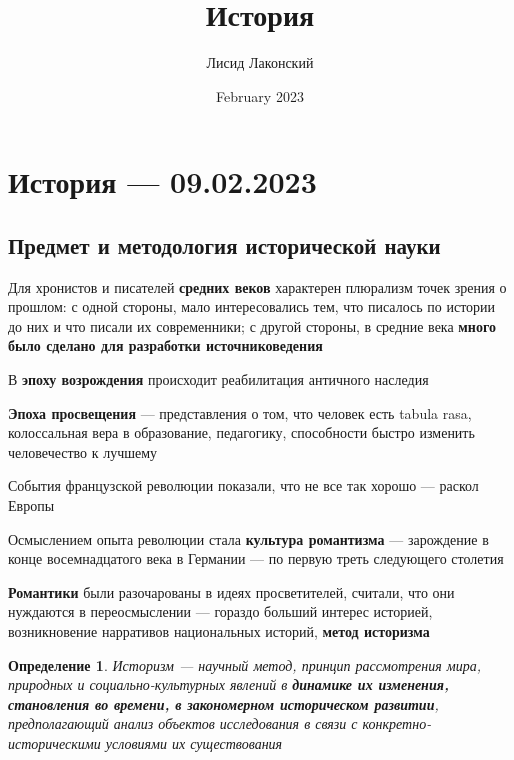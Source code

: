 \documentclass{article}
\title{История}
\author{Лисид Лаконский}
\date{February 2023}
\newtheorem{definition}{Определение}
\begin{document}
\raggedright

\maketitle
\tableofcontents
\pagebreak

\section{История — 09.02.2023}

\subsection{Предмет и методология исторической науки}

Для хронистов и писателей \textbf{средних веков} характерен плюрализм точек зрения о прошлом: с одной стороны, мало интересовались тем, что писалось по истории до них и что писали их современники; с другой стороны, в средние века \textbf{много было сделано для разработки источниковедения}

\hfill

В \textbf{эпоху возрождения} происходит реабилитация античного наследия

\hfill

\textbf{Эпоха просвещения} — представления о том, что человек есть tabula rasa, колоссальная вера в образование, педагогику, способности быстро изменить человечество к лучшему

События французской революции показали, что не все так хорошо — раскол Европы

\hfill

Осмыслением опыта революции стала \textbf{культура романтизма} — зарождение в конце восемнадцатого века в Германии — по первую треть следующего столетия

\textbf{Романтики} были разочарованы в идеях просветителей, считали, что они нуждаются в переосмыслении — гораздо больший интерес историей, возникновение нарративов национальных историй, \textbf{метод историзма}

\begin{definition}
Историзм — научный метод, принцип рассмотрения мира, природных и социально-культурных явлений в \textbf{динамике их изменения, становления во времени, в закономерном историческом развитии}, предполагающий анализ объектов исследования в связи с конкретно-историческими условиями их существования
\end{definition}
\end{document}
